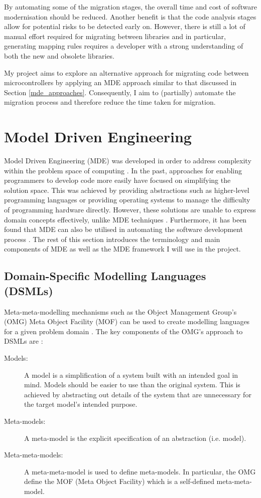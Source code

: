 \documentclass{UoYCSproject}
\begin{document}
By automating some of the migration stages, the overall time and cost of software modernisation should be reduced. Another benefit is that the code analysis stages allow for potential risks to be detected early on. However, there is still a lot of manual effort required for migrating between libraries and in particular, generating mapping rules requires a developer with a strong understanding of both the new and obsolete libraries.

My project aims to explore an alternative approach for migrating code between microcontrollers by applying an MDE approach similar to that discussed in Section \ref{mde_approaches}. Consequently, I aim to (partially) automate the migration process and therefore reduce the time taken for migration.

\section{Model Driven Engineering} \label{mde_bg}
Model Driven Engineering (MDE) was developed in order to address complexity within the problem space of computing \parencite{schmidt2006model}. In the past, approaches for enabling programmers to develop code more easily have focused on simplifying the solution space. This was achieved by providing abstractions such as higher-level programming languages or providing operating systems to manage the difficulty of programming hardware directly. However, these solutions are unable to express domain concepts effectively, unlike MDE techniques \parencite{schmidt2006model}. Furthermore, it has been found that MDE can also be utilised in automating the software development process \parencite{bezivin2004search}.
\newline
The rest of this section introduces the terminology and main components of MDE as well as the MDE framework I will use in the project.

\subsection{Domain-Specific Modelling Languages (DSMLs)}
Meta-meta-modelling mechanisms such as the Object Management Group's (OMG) Meta Object Facility (MOF) can be used to create modelling languages for a given problem domain \parencite{mussbacher2014relevance}. The key components of the OMG's approach to DSMLs are \parencite{bezivin2001towards}:
\begin{description}
\item[Models:] A model is a simplification of a system built with an intended goal in mind. Models should be easier to use than the original system. This is achieved by abstracting out details of the system that are unnecessary for the target model's intended purpose.
\item[Meta-models:] A meta-model is the explicit specification of an abstraction (i.e. model). 
\item[Meta-meta-models:]  A meta-meta-model is used to define meta-models. In particular, the OMG define the MOF (Meta Object Facility) which is a self-defined meta-meta-model.
\end{description}
\end{document}
